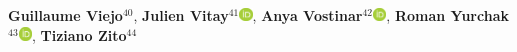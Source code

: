 \textbf{Guillaume Viejo}$^{40}$,
\textbf{Julien Vitay}$^{41}$\href{http://orcid.org/0000-0001-5229-2349}{\includegraphics[width=10pt]{orcid}},
\textbf{Anya Vostinar}$^{42}$\href{http://orcid.org/0000-0001-7216-5283}{\includegraphics[width=10pt]{orcid}},
\textbf{Roman Yurchak}$^{43}$\href{http://orcid.org/0000-0002-2565-4444}{\includegraphics[width=10pt]{orcid}},
\textbf{Tiziano Zito}$^{44}$\\
